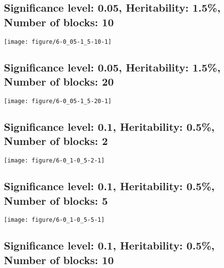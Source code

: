 \documentclass[11pt,letter]{article}\usepackage[]{graphicx}\usepackage[]{color}
\makeatletter
\def\maxwidth{ %
  \ifdim\Gin@nat@width>\linewidth
    \linewidth
  \else
    \Gin@nat@width
  \fi
}
\newenvironment{knitrout}{}{} %
\makeatother
\begin{document}
\newpage
\subsection{Significance level: 0.05, Heritability: 1.5\%, Number of blocks: 10}

\begin{knitrout}
\color{fgcolor}
\texttt{[image: figure/6-0\_05-1\_5-10-1]} 

\end{knitrout}

\newpage
\subsection{Significance level: 0.05, Heritability: 1.5\%, Number of blocks: 20}

\begin{knitrout}
\color{fgcolor}
\texttt{[image: figure/6-0\_05-1\_5-20-1]} 

\end{knitrout}

\newpage
\subsection{Significance level: 0.1, Heritability: 0.5\%, Number of blocks: 2}

\begin{knitrout}
\color{fgcolor}
\texttt{[image: figure/6-0\_1-0\_5-2-1]} 

\end{knitrout}

\newpage
\subsection{Significance level: 0.1, Heritability: 0.5\%, Number of blocks: 5}

\begin{knitrout}
\color{fgcolor}
\texttt{[image: figure/6-0\_1-0\_5-5-1]} 

\end{knitrout}

\newpage
\subsection{Significance level: 0.1, Heritability: 0.5\%, Number of blocks: 10}
\end{document}
